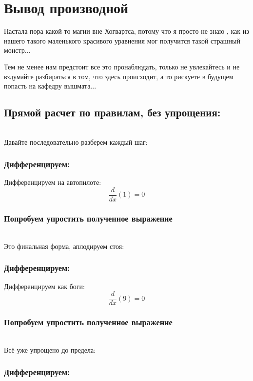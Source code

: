 \documentclass[a4paper,12pt]{article}
\begin{document}
\section{Вывод производной}Настала пора какой-то магии вне Хогвартса, потому что я просто не знаю , как из нашего такого маленького красивого уравнения мог получится такой страшный монстр...\

Тем не менее нам предстоит все это пронаблюдать, только не увлекайтесь и не вздумайте разбираться в том, что здесь происходит,
а то рискуете в будущем попасть на кафедру вышмата...

\subsection*{Прямой расчет по правилам, без упрощения:}\\
Давайте последовательно разберем каждый шаг:

\subsubsection*{Дифференцируем:}

Дифференцируем на автопилоте:
\begin{dmath}\frac{d}{dx}\left(1\right)=0\end{dmath}
\subsubsection*{Попробуем упростить полученное выражение}
\\Это финальная форма, аплодируем стоя:

\subsubsection*{Дифференцируем:}

Дифференцируем как боги:
\begin{dmath}\frac{d}{dx}\left(9\right)=0\end{dmath}
\subsubsection*{Попробуем упростить полученное выражение}
\\Всё уже упрощено до предела:

\subsubsection*{Дифференцируем:}
\end{document}
